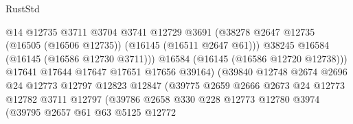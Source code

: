 \begin{lexlean}{RustStd}
\begin{coremodule}
                                          @14
                                          @12735
                                          @3711
                                          @3704
                                          @3741
                                          @12729
                                          @3691
                                          (@38278
                                            @2647
                                            @12735
                                            (@16505 (@16506 @12735))
                                            (@16145 (@16511 @2647 @61)))
                                          @38245
                                          @16584
                                          (@16145 (@16586 @12730 @3711)))
                                        @16584
                                        (@16145 (@16586 @12720 @12738)))
                                      @17641
                                      @17644
                                      @17647
                                      @17651
                                      @17656
                                      @39164)
                                    (@39840
                                      @12748
                                      @2674
                                      @2696
                                      @24
                                      @12773
                                      @12797
                                      @12823
                                      @12847
                                      (@39775
                                        @2659
                                        @2666
                                        @2673
                                        @24
                                        @12773
                                        @12782
                                        @3711
                                        @12797
                                        (@39786
                                          @2658
                                          @330
                                          @228
                                          @12773
                                          @12780
                                          @3974
                                          (@39795
                                            @2657
                                            @61
                                            @63
                                            @5125
                                            @12772

\end{coremodule}
\end{lexlean}
